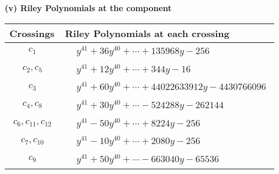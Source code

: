 \documentclass[1p]{elsarticle_modified}
\theoremstyle{definition}
\begin{document}
\flushleft \textbf{(v) Riley Polynomials at the component}\newline \\
\begin{tabular}{m{50pt}|m{274pt}}
Crossings & \hspace{64pt}Riley Polynomials at each crossing \\
\hline $$\begin{aligned}c_{1}\end{aligned}$$&$\begin{aligned}
&y^{41}+36 y^{40}+\cdots+135968 y-256
\end{aligned}$\\
\hline $$\begin{aligned}c_{2},c_{5}\end{aligned}$$&$\begin{aligned}
&y^{41}+12 y^{40}+\cdots+344 y-16
\end{aligned}$\\
\hline $$\begin{aligned}c_{3}\end{aligned}$$&$\begin{aligned}
&y^{41}+60 y^{40}+\cdots+44022633912 y-4430766096
\end{aligned}$\\
\hline $$\begin{aligned}c_{4},c_{8}\end{aligned}$$&$\begin{aligned}
&y^{41}+30 y^{40}+\cdots-524288 y-262144
\end{aligned}$\\
\hline $$\begin{aligned}c_{6},c_{11},c_{12}\end{aligned}$$&$\begin{aligned}
&y^{41}-50 y^{40}+\cdots+8224 y-256
\end{aligned}$\\
\hline $$\begin{aligned}c_{7},c_{10}\end{aligned}$$&$\begin{aligned}
&y^{41}-10 y^{40}+\cdots+2080 y-256
\end{aligned}$\\
\hline $$\begin{aligned}c_{9}\end{aligned}$$&$\begin{aligned}
&y^{41}+50 y^{40}+\cdots-663040 y-65536
\end{aligned}$\\
\hline
\end{tabular}\\~\\
\end{document}
